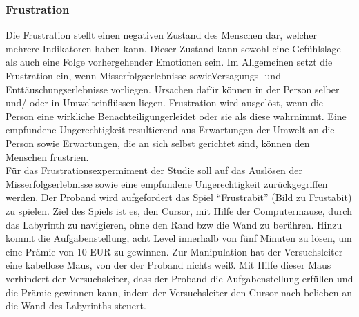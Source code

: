 \subsubsection{Frustration} \label{frust-1}



Die Frustration stellt einen negativen Zustand des Menschen dar, welcher mehrere Indikatoren haben kann. Dieser Zustand kann sowohl eine Gef{\"u}hlslage als auch eine Folge vorhergehender Emotionen sein.
Im Allgemeinen setzt die Frustration ein, wenn Misserfolgserlebnisse sowieVersagungs- und Entt{\"a}uschungserlebnisse vorliegen. 
Ursachen daf{\"u}r k{\"o}nnen in der Person selber und/ oder in Umwelteinfl{\"u}ssen liegen. 
Frustration wird ausgel{\"o}st, wenn die Person eine wirkliche Benachteiligungerleidet oder sie als diese wahrnimmt. 
Eine empfundene Ungerechtigkeit resultierend aus Erwartungen der Umwelt an die Person sowie Erwartungen, die an sich selbst gerichtet sind, k{\"o}nnen den Menschen frustrien. \\

F{\"u}r das Frustrationsexpermiment der Studie soll auf das Ausl{\"o}sen der Misserfolgserlebnisse sowie eine empfundene Ungerechtigkeit zur{\"u}ckgegriffen werden. Der Proband wird aufgefordert das Spiel ``Frustrabit'' (Bild zu Frustabit) zu spielen. 
Ziel des Spiels ist es, den Cursor, mit Hilfe der Computermause, durch das Labyrinth zu navigieren, ohne den Rand bzw die Wand zu ber{\"u}hren. 
Hinzu kommt die Aufgabenstellung, acht Level  innerhalb von f{\"u}nf Minuten zu l{\"o}sen, um eine Pr{\"a}mie von 10 EUR zu gewinnen.
Zur Manipulation hat der Versuchsleiter eine kabellose Maus, von der der Proband nichts wei{\ss}. 
Mit Hilfe dieser Maus verhindert der Versuchsleiter, dass der Proband die Aufgabenstellung erf{\"u}llen und die Pr{\"a}mie gewinnen kann, indem der Versuchsleiter den Cursor nach belieben an die Wand des Labyrinths steuert. 

